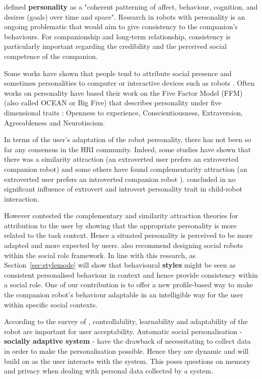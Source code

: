 \documentclass[smallextended]{svjour3}
\begin{document}
\cite{Revelle2009} defined \textbf{personality} as a "coherent patterning of affect, behaviour, cognition, and desires (goals) over time and space". 
Research in robots with personality is an ongoing problematic that would aim to give consistency to the companion's behaviours.
For companionship and long-term relationship, consistency is particularly important regarding the credibility and the perceived social competence of the companion. 

Some works have shown that people tend to attribute social presence and sometimes personalities to computer or interactive devices such as robots \cite{Woods2006,Meerbeek2009}. 
Often works on personality have based their work on the Five Factor Model (FFM) (also called OCEAN or Big Five) that describes personality under five dimensional traits : Openness to experience, Conscientiousness, Extraversion, Agreeableness and Neurotiscism. 


In terms of the user's adaptation of the robot personality, there has not been so far any consensus in the HRI community. 
Indeed, some studies have shown that there was a similarity attraction (an extroverted user prefers an extroverted companion robot) \cite{Isbister2000} and some others have found complementarity attraction (an extroverted user prefers an introverted companion robot \cite{Lee2006,Tapus2008}). 
\cite{Belpaeme2012a} concluded in no significant influence of extrovert and introvert personality trait in child-robot interaction.

However \cite{Joosse2013a} contested the complementary and similarity attraction theories for attribution to the user by showing that the appropriate personality is more related to the task context. 
Hence a situated personality is perceived to be more adapted and more expected by users. 
\cite{Tay2014} also recommend designing social robots within the social role framework. 
In line with this research, as Section~\ref{sec:stylemode} will show that behavioural \textbf{styles} might be seen as consistent personalised behaviour in context and hence provide consistency within a social role. 
One of our contribution is to offer a new profile-based way to make the companion robot's behaviour adaptable in an intelligible way for the user within specific social contexts. 

According to the survey of \cite{Mahani2009}, controllability, learnability and adaptability of the robot are important for user acceptability. 
Automatic social personalisation - \textbf{socially adaptive system} - have the drawback of necessitating to collect data in order to make the personalisation possible. 
Hence they are dynamic and will build on as the user interacts with the system. 
This poses questions on memory and privacy when dealing with personal data collected by a system. 
\end{document}
